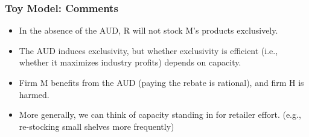\begin{frame}
  \frametitle{Toy Model:  Comments}
\footnotesize
\begin{itemize}
\item In the absence of the AUD, R will not stock M's products exclusively.
\item The AUD induces exclusivity, but whether exclusivity is efficient (i.e., whether it maximizes industry profits) depends on capacity.
\item Firm M benefits from the AUD (paying the rebate is rational), and firm H is harmed.
\item More generally, we can think of capacity standing in for retailer effort.  (e.g., re-stocking small shelves more frequently)
\end{itemize}

\end{frame}


